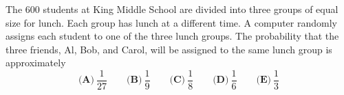 The $600$ students at King Middle School are divided into three groups of equal size for lunch. Each group has lunch at a different time. A computer randomly assigns each student to one of the three lunch groups. The probability that the three friends, Al, Bob, and Carol, will be assigned to the same lunch group is approximately
\[\textbf{(A)}\ \dfrac{1}{27}\qquad\textbf{(B)}\ \dfrac{1}{9}\qquad\textbf{(C)}\ \dfrac{1}{8}\qquad\textbf{(D)}\ \dfrac{1}{6}\qquad\textbf{(E)}\ \dfrac{1}{3}\]
